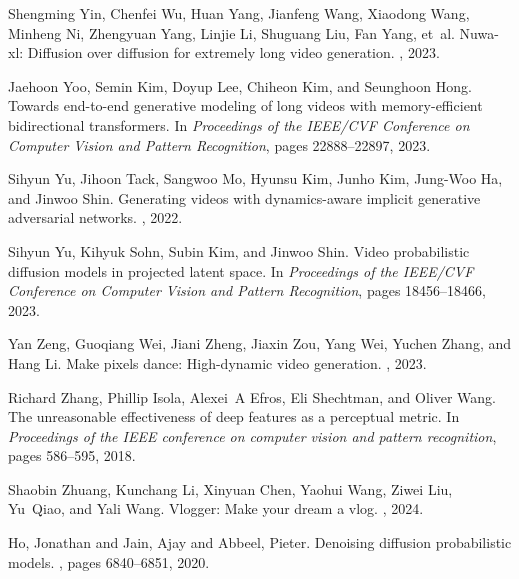 \documentclass{article}
\begin{document}
\begin{thebibliography}{}
Shengming Yin, Chenfei Wu, Huan Yang, Jianfeng Wang, Xiaodong Wang, Minheng Ni, Zhengyuan Yang, Linjie Li, Shuguang Liu, Fan Yang, et~al.
\newblock Nuwa-xl: Diffusion over diffusion for extremely long video generation.
, 2023.

Jaehoon Yoo, Semin Kim, Doyup Lee, Chiheon Kim, and Seunghoon Hong.
\newblock Towards end-to-end generative modeling of long videos with memory-efficient bidirectional transformers.
\newblock In {\em Proceedings of the IEEE/CVF Conference on Computer Vision and Pattern Recognition}, pages 22888--22897, 2023.

Sihyun Yu, Jihoon Tack, Sangwoo Mo, Hyunsu Kim, Junho Kim, Jung-Woo Ha, and Jinwoo Shin.
\newblock Generating videos with dynamics-aware implicit generative adversarial networks.
, 2022.

Sihyun Yu, Kihyuk Sohn, Subin Kim, and Jinwoo Shin.
\newblock Video probabilistic diffusion models in projected latent space.
\newblock In {\em Proceedings of the IEEE/CVF Conference on Computer Vision and Pattern Recognition}, pages 18456--18466, 2023.

Yan Zeng, Guoqiang Wei, Jiani Zheng, Jiaxin Zou, Yang Wei, Yuchen Zhang, and Hang Li.
\newblock Make pixels dance: High-dynamic video generation.
, 2023.

Richard Zhang, Phillip Isola, Alexei~A Efros, Eli Shechtman, and Oliver Wang.
\newblock The unreasonable effectiveness of deep features as a perceptual metric.
\newblock In {\em Proceedings of the IEEE conference on computer vision and pattern recognition}, pages 586--595, 2018.

Shaobin Zhuang, Kunchang Li, Xinyuan Chen, Yaohui Wang, Ziwei Liu, Yu~Qiao, and Yali Wang.
\newblock Vlogger: Make your dream a vlog.
, 2024.

Ho, Jonathan and Jain, Ajay and Abbeel, Pieter.
\newblock Denoising diffusion probabilistic models.
, pages 6840--6851, 2020.


\end{thebibliography}
\end{document}
